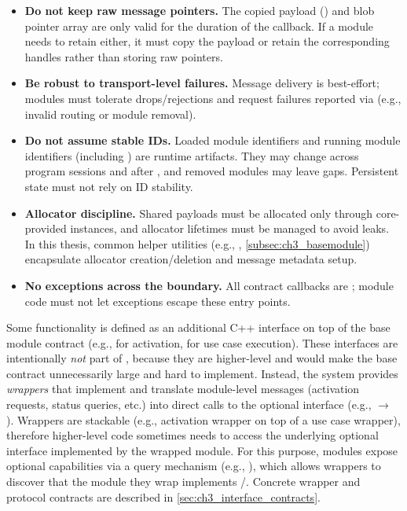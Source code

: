 \begin{itemize}
    \item \textbf{Do not keep raw message pointers.} The copied payload () and blob pointer array are only valid for the duration of the callback. If a module needs to retain either, it must copy the payload or retain the corresponding  handles rather than storing raw pointers.
    \item \textbf{Be robust to transport-level failures.} Message delivery is best-effort; modules must tolerate drops/rejections and request failures reported via  (e.g., invalid routing or module removal).
    \item \textbf{Do not assume stable IDs.} Loaded module identifiers and running module identifiers (including ) are runtime artifacts. They may change across program sessions and after , and removed modules may leave gaps. Persistent state must not rely on ID stability.
    \item \textbf{Allocator discipline.} Shared payloads must be allocated only through core-provided  instances, and allocator lifetimes must be managed to avoid leaks. In this thesis, common helper utilities (e.g., , \autoref{subsec:ch3_basemodule}) encapsulate allocator creation/deletion and message metadata setup.
    \item \textbf{No exceptions across the boundary.} All contract callbacks are ; module code must not let exceptions escape these entry points.
\end{itemize}

Some functionality is defined as an additional C++ interface on top of the base module contract (e.g.,  for activation,  for use case execution). These interfaces are intentionally \emph{not} part of , because they are higher-level and would make the base contract unnecessarily large and hard to implement. Instead, the system provides \emph{wrappers} that implement  and translate module-level messages (activation requests, status queries, etc.) into direct calls to the optional interface (e.g.,  $\rightarrow$ ). Wrappers are stackable (e.g., activation wrapper on top of a use case wrapper), therefore higher-level code sometimes needs to access the underlying optional interface implemented by the wrapped module. For this purpose, modules expose optional capabilities via a query mechanism (e.g., ), which allows wrappers to discover that the module they wrap implements /. Concrete wrapper and protocol contracts are described in \autoref{sec:ch3_interface_contracts}.

